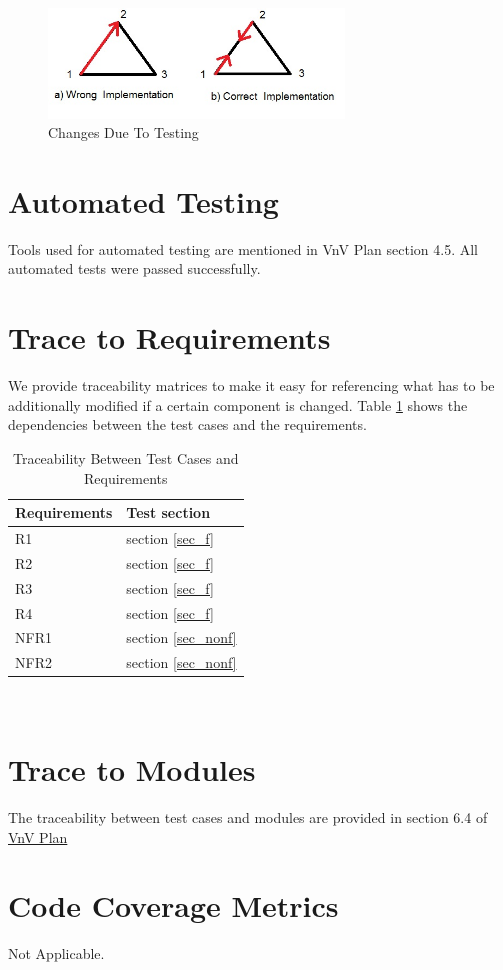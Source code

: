 \documentclass[12pt, titlepage]{article}
\begin{document}
\begin{figure}[h!]
\begin{center}
 \includegraphics[width=0.7\textwidth]{bug.jpg}
\caption{Changes Due To Testing}
\label{Fig_bug} 
\end{center}
\end{figure}
\section{Automated Testing}
Tools used for automated testing are mentioned in VnV Plan section 4.5. All automated tests were passed successfully.		
\section{Trace to Requirements}
We provide traceability matrices to make it easy for referencing 
what has to be additionally modified if a certain component is changed.
Table  \ref{Table_req} shows the dependencies between the test cases and the requirements.
\begin{table}[h!]
	\centering
	\begin{tabular}{l l} 
		\toprule		
		\textbf{Requirements} & \textbf{Test section}\\
		\midrule 
		R1 & section \ref{sec_f}\\
		R2 & section \ref{sec_f}\\
		R3 & section \ref{sec_f}\\
		R4 & section \ref{sec_f} \\
		NFR1 & section \ref{sec_nonf}\\
		NFR2 & section \ref{sec_nonf}\\
		
		\bottomrule
	\end{tabular}\\
	
	\caption{Traceability Between Test Cases and Requirements} 
	\label{Table_req}
\end{table}
	
\section{Trace to Modules}		
The traceability between test cases and modules are provided in section 6.4 of \href{https://github.com/Maryamvalian/project741/blob/cfe06182f41c842e3b44aa0eb33d661cf8a3ce79/docs/VnVPlan/VnVPlan.pdf}{VnV Plan} 
\section{Code Coverage Metrics}
Not Applicable.



\newpage{}
\end{document}
